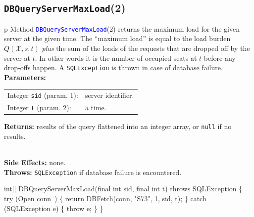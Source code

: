 \subsection{{\tt{}\protect{}DBQueryServerMaxLoad}(2)}
\begin{tabular}{p{\textwidth}}
\toprule
{}
Method \textcolor{blue}{{\tt{}\protect{}DBQueryServerMaxLoad}}(2) returns the maximum load
for the given server at the given time. The ``maximum load'' is equal to the
load burden $Q(\mathcal{X},s,t)$ \emph{plus} the sum of the loads of the
requests that are dropped off by the server at $t$. In other words it is the
number of occupied seats at $t$ before any drop-offs happen.
A {\tt{}SQLException} is thrown in case of database failure.\\
\midrule
\textbf{Parameters:} \\
\begin{tabular}{lp{116mm}}
Integer {\tt{}sid} (param. 1):&server identifier.\\
Integer {\tt{}t} (param. 2):&a time.\\
\end{tabular}
\textbf{Returns:} results of the query flattened into an integer array,
or {\tt{}null} if no results.

\\
\textbf{Side Effects:} none.\\
\textbf{Throws:} {\tt{}SQLException} if database failure is encountered.\\
\bottomrule
\end{tabular}
\nwenddocs{}\endmoddef{}
int[] DBQueryServerMaxLoad(final int sid, final int t) throws SQLException \{
  try (\LA{}Open \code{}conn\edoc{}~{\nwtagstyle{}}\RA{}) \{
    return DBFetch(conn, "S73", 1, sid, t);
  \} catch (SQLException e) \{
    throw e;
  \}
\}
\eatline
